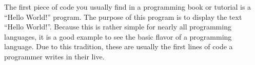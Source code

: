 
The first piece of code you usually find in a programming book or tutorial is a ``Hello World!'' program. The purpose of this program is to display the text ``Hello World!''. Because this is rather simple for nearly all programming languages, it is a good example to see the basic flavor of a programming language. Due to this tradition, these are usually the first lines of code a programmer writes in their live.

